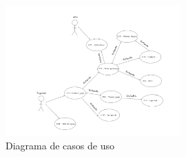 \documentclass[a4paper]{article}
\begin{document}
\begin{figure}[ht]
    \centering
    \includegraphics[width=0.6\textwidth]{Images/diagramaCU.PNG}
    \caption{Diagrama de casos de uso}
    \label{fig:diagramas}
\end{figure}

\clearpage
\end{document}
